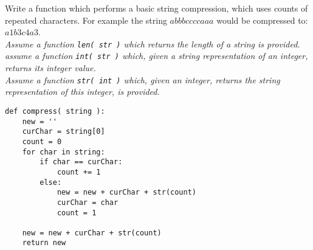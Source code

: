 Write a function which performs a basic string compression, which uses counts of repeated characters. For example 
the string $abbbccccaaa$ would be compressed to: $a1b3c4a3$. \\
 \emph{Assume a function \texttt{len( str )} which returns the length of a string is provided. \\
      assume a function \texttt{int( str )} which, given a string representation of an integer, returns its integer value. \\
      Assume a function \texttt{str( int )} which, given an integer, returns the string representation of this integer, is provided. }

\begin{answer}
\begin{lstlisting}
def compress( string ):
    new = ''
    curChar = string[0]
    count = 0
    for char in string:
        if char == curChar:
            count += 1
        else:
            new = new + curChar + str(count)
            curChar = char
            count = 1 

    new = new + curChar + str(count)
    return new
\end{lstlisting}
\end{answer}